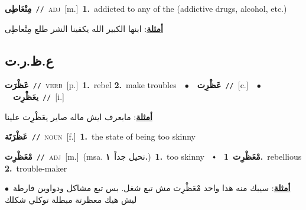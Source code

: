 \documentclass[10pt,a4paper,twoside]{article} %
\begin{document}
\begin{multicols}{2}
{\setlength\topsep{0pt}\textbf{\foreignlanguage{arabic}{مِتْعَاطِى}}\ {\color{gray}\texttt{//}\color{black}}\ \textsc{adj}\ [m.]\ \textbf{1.}~addicted to any of the (addictive drugs, alcohol, etc.)\  \begin{flushright}\color{gray}\foreignlanguage{arabic}{\textbf{\underline{\foreignlanguage{arabic}{أمثلة}}}: ابنها الكبير الله يكفينا الشر طلع مِتْعاطِى}\end{flushright}\color{black}} \vspace{2mm}

\vspace{-3mm}
\subsection*{\color{blue}\foreignlanguage{arabic}{ع.ظ.ر.ت}\color{blue}{}} 

{\setlength\topsep{0pt}\textbf{\foreignlanguage{arabic}{عَظْرَت}}\ {\color{gray}\texttt{//}\color{black}}\ \textsc{verb}\ [p.]\ \textbf{1.}~rebel  \textbf{2.}~make troubles\ \ $\bullet$\ \ \setlength\topsep{0pt}\textbf{\foreignlanguage{arabic}{عَظْرِت}}\ {\color{gray}\texttt{//}\color{black}}\ [c.]\ \ $\bullet$\ \ \setlength\topsep{0pt}\textbf{\foreignlanguage{arabic}{يعَظْرِت}}\ {\color{gray}\texttt{//}\color{black}}\ [i.]\  \begin{flushright}\color{gray}\foreignlanguage{arabic}{\textbf{\underline{\foreignlanguage{arabic}{أمثلة}}}: مابعرف ايش ماله صاير يعَظْرِت علينا}\end{flushright}\color{black}} \vspace{2mm}

{\setlength\topsep{0pt}\textbf{\foreignlanguage{arabic}{عَظْرَتَة}}\ {\color{gray}\texttt{//}\color{black}}\ \textsc{noun}\ [f.]\ \textbf{1.}~the state of being too skinny\ } \vspace{2mm}

{\setlength\topsep{0pt}\textbf{\foreignlanguage{arabic}{مْعَظْرِت}}\ {\color{gray}\texttt{//}\color{black}}\ \textsc{adj}\ [m.]\ \color{gray}(msa. \foreignlanguage{arabic}{نحيل جداً}~\foreignlanguage{arabic}{\textbf{١.}})\color{black}\ \textbf{1.}~too skinny\ \ $\smblkdiamond$\ \ \setlength\topsep{0pt}\textbf{\foreignlanguage{arabic}{مْعَظْرِت}}\ \textbf{1.}~rebellious  \textbf{2.}~trouble-maker\  \begin{flushright}\color{gray}\foreignlanguage{arabic}{\textbf{\underline{\foreignlanguage{arabic}{أمثلة}}}: سيبك منه هذا واحد مْعَظْرِت مش تبع شغل. بس تبع مشاكل ودواوين فارطة\ $\bullet$\ \  ليش هيك معظرتة مبطلة توكلي شكلك}\end{flushright}\color{black}} \vspace{2mm}


\end{multicols}
\end{document}
